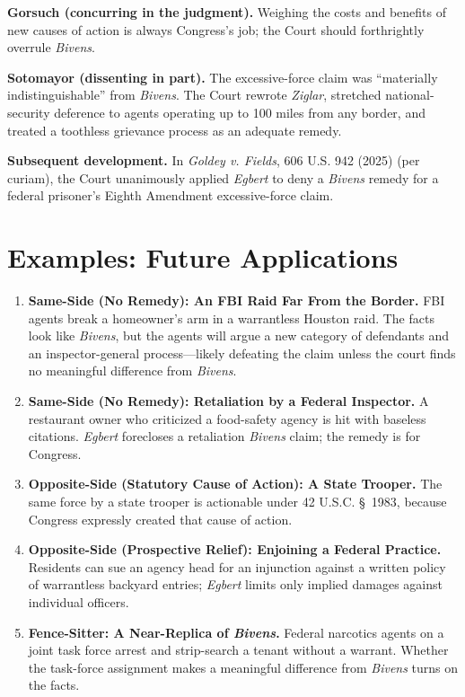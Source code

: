 \documentclass[12pt]{article}
\begin{document}
\textbf{Gorsuch (concurring in the judgment).} Weighing the costs and benefits of new causes of action is always Congress's job; the Court should forthrightly overrule \textit{Bivens}.

\textbf{Sotomayor (dissenting in part).} The excessive-force claim was ``materially indistinguishable'' from \textit{Bivens}. The Court rewrote \textit{Ziglar}, stretched national-security deference to agents operating up to 100 miles from any border, and treated a toothless grievance process as an adequate remedy.

\textbf{Subsequent development.} In \textit{Goldey v. Fields}, 606 U.S. 942 (2025) (per curiam), the Court unanimously applied \textit{Egbert} to deny a \textit{Bivens} remedy for a federal prisoner's Eighth Amendment excessive-force claim.

\section{Examples: Future Applications}

\begin{enumerate}
\item \textbf{Same-Side (No Remedy): An FBI Raid Far From the Border.} FBI agents break a homeowner's arm in a warrantless Houston raid. The facts look like \textit{Bivens}, but the agents will argue a new category of defendants and an inspector-general process---likely defeating the claim unless the court finds no meaningful difference from \textit{Bivens}.
\item \textbf{Same-Side (No Remedy): Retaliation by a Federal Inspector.} A restaurant owner who criticized a food-safety agency is hit with baseless citations. \textit{Egbert} forecloses a retaliation \textit{Bivens} claim; the remedy is for Congress.
\item \textbf{Opposite-Side (Statutory Cause of Action): A State Trooper.} The same force by a state trooper is actionable under 42 U.S.C. \S~1983, because Congress expressly created that cause of action.
\item \textbf{Opposite-Side (Prospective Relief): Enjoining a Federal Practice.} Residents can sue an agency head for an injunction against a written policy of warrantless backyard entries; \textit{Egbert} limits only implied damages against individual officers.
\item \textbf{Fence-Sitter: A Near-Replica of \textit{Bivens}.} Federal narcotics agents on a joint task force arrest and strip-search a tenant without a warrant. Whether the task-force assignment makes a meaningful difference from \textit{Bivens} turns on the facts.
\end{enumerate}
\end{document}
